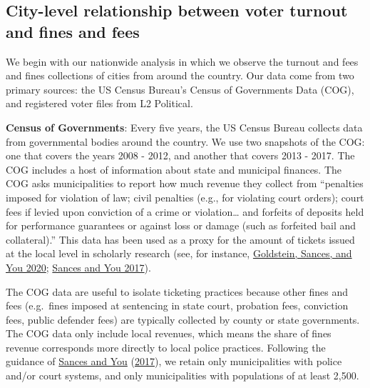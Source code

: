 \documentclass[
  12pt,
]{article}
\begin{document}
\hypertarget{city-level-relationship-between-voter-turnout-and-fines-and-fees}{%
\subsection*{City-level relationship between voter turnout and fines and fees}\label{city-level-relationship-between-voter-turnout-and-fines-and-fees}}

We begin with our nationwide analysis in which we observe the turnout and fees and fines collections of cities from around the country. Our data come from two primary sources: the US Census Bureau's Census of Governments Data (COG), and registered voter files from L2 Political.

\textbf{Census of Governments}: Every five years, the US Census Bureau collects data from governmental bodies around the country. We use two snapshots of the COG: one that covers the years 2008 - 2012, and another that covers 2013 - 2017. The COG includes a host of information about state and municipal finances. The COG asks municipalities to report how much revenue they collect from ``penalties imposed for violation of law; civil penalties (e.g., for violating court orders); court fees if levied upon conviction of a crime or violation\ldots{} and forfeits of deposits held for performance guarantees or against loss or damage (such as forfeited bail and collateral).'' This data has been used as a proxy for the amount of tickets issued at the local level in scholarly research (see, for instance, \protect\hyperlink{ref-Goldstein2020}{Goldstein, Sances, and You 2020}; \protect\hyperlink{ref-Sances2017}{Sances and You 2017}).

The COG data are useful to isolate ticketing practices because other fines and fees (e.g.~fines imposed at sentencing in state court, probation fees, conviction fees, public defender fees) are typically collected by county or state governments. The COG data only include local revenues, which means the share of fines revenue corresponds more directly to local police practices. Following the guidance of \protect\hyperlink{ref-Sances2017}{Sances and You} (\protect\hyperlink{ref-Sances2017}{2017}), we retain only municipalities with police and/or court systems, and only municipalities with populations of at least 2,500.
\end{document}
